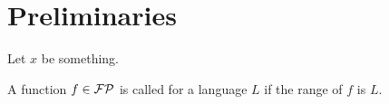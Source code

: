 \chapter{Preliminaries}
  Let \(x\) be something.

  \begin{definition}
    A function \(f \in \mathcal{FP}\) is called  for a language \(L\) if the range of \(f\) is \(L\).
  \end{definition}
